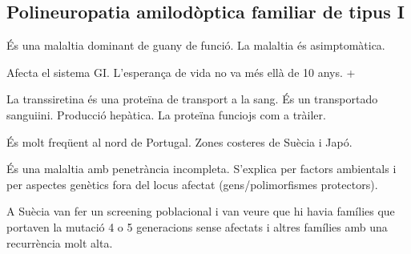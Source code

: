 \subsection{Polineuropatia amilodòptica familiar de tipus I}
És una malaltia dominant de guany de funció. La malaltia és asimptomàtica.

Afecta el sistema GI. L'esperança de vida no va més ellà de 10 anys. +

La transsiretina és una proteïna de transport a la sang. És un transportado sanguiini. Producció hepàtica. La proteïna funciojs com a tràiler. 

És molt freqüent al nord de Portugal. Zones costeres de Suècia i Japó.

És una malaltia amb penetrància incompleta. S'explica per factors ambientals i per aspectes genètics fora del locus afectat (gens/polimorfismes protectors).

A Suècia van fer un screening poblacional i van veure que hi havia famílies que portaven la mutació 4 o 5 generacions sense afectats i altres famílies amb una recurrència molt alta.

